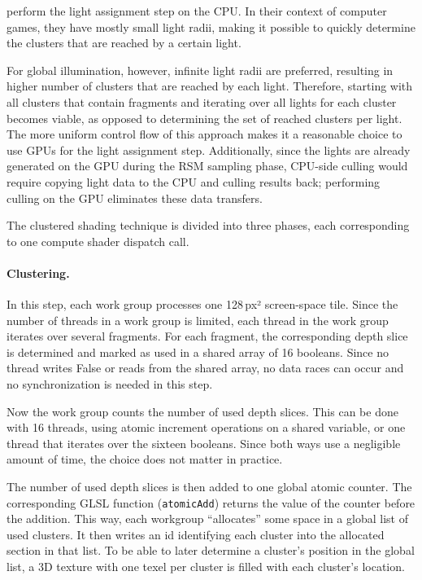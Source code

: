 \citet{persson::2013::practical} perform the light assignment step on the CPU. In their context of computer games, they have mostly small light radii, making it possible to quickly determine the clusters that are reached by a certain light.

For global illumination, however, infinite light radii are preferred, resulting in higher number of clusters that are reached by each light. Therefore, starting with all clusters that contain fragments and iterating over all lights for each cluster becomes viable, as opposed to determining the set of reached clusters per light. The more uniform control flow of this approach makes it a reasonable choice to use GPUs for the light assignment step. Additionally, since the lights are already generated on the GPU during the RSM sampling phase, CPU-side culling would require copying light data to the CPU and culling results back; performing culling on the GPU eliminates these data transfers.


The clustered shading technique is divided into three phases, each corresponding to one compute shader dispatch call.

\paragraph{Clustering.}
In this step, each work group processes one 128\,px² screen-space tile. Since the number of threads in a work group is limited, each thread in the work group iterates over several fragments. For each fragment, the corresponding depth slice is determined and marked as used in a shared array of 16 booleans. Since no thread writes False or reads from the shared array, no data races can occur and no synchronization is needed in this step.

Now the work group counts the number of used depth slices. This can be done with 16 threads, using atomic increment operations on a shared variable, or one thread that iterates over the sixteen booleans. Since both ways use a negligible amount of time, the choice does not matter in practice.

The number of used depth slices is then added to one global atomic counter. The corresponding GLSL function (\texttt{atomicAdd}) returns the value of the counter before the addition. This way, each workgroup ``allocates'' some space in a global list of used clusters. It then writes an id identifying each cluster into the allocated section in that list. To be able to later determine a cluster's position in the global list, a 3D texture with one texel per cluster is filled with each cluster's location.

